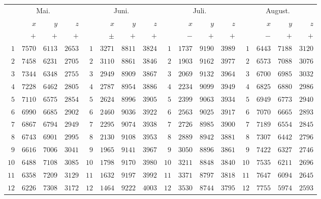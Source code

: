 \begin{GaussVISolarFrame}
\begingroup\fontsize{9}{10.2}\selectfont\setlength{\tabcolsep}{1.9pt}
\begin{tabular}{r|r|r|r||r|r|r|r||r|r|r|r||r|r|r|r}
\multicolumn{4}{c||}{Mai.} & \multicolumn{4}{c||}{Juni.} & \multicolumn{4}{c||}{Juli.} & \multicolumn{4}{c}{August.}\\[3pt]
 & $x$ & $y$ & $z$ &  & $x$ & $y$ & $z$ &  & $x$ & $y$ & $z$ &  & $x$ & $y$ & $z$\\
 & $+$ & $+$ & $+$ &  & $\pm$ & $+$ & $+$ &  & $-$ & $+$ & $+$ &  & $-$ & $+$ & $+$\\\hline
$1$ & $7570$ & $6113$ & $2653$ & $1$ & $3271$ & $8811$ & $3824$ & $1$ & $1737$ & $9190$ & $3989$ & $1$ & $6443$ & $7188$ & $3120$\\
$2$ & $7458$ & $6231$ & $2705$ & $2$ & $3110$ & $8861$ & $3846$ & $2$ & $1903$ & $9162$ & $3977$ & $2$ & $6573$ & $7088$ & $3076$\\
$3$ & $7344$ & $6348$ & $2755$ & $3$ & $2949$ & $8909$ & $3867$ & $3$ & $2069$ & $9132$ & $3964$ & $3$ & $6700$ & $6985$ & $3032$\\
$4$ & $7228$ & $6462$ & $2805$ & $4$ & $2787$ & $8954$ & $3886$ & $4$ & $2234$ & $9099$ & $3949$ & $4$ & $6825$ & $6880$ & $2986$\\
$5$ & $7110$ & $6575$ & $2854$ & $5$ & $2624$ & $8996$ & $3905$ & $5$ & $2399$ & $9063$ & $3934$ & $5$ & $6949$ & $6773$ & $2940$\\[3pt]
$6$ & $6990$ & $6685$ & $2902$ & $6$ & $2460$ & $9036$ & $3922$ & $6$ & $2563$ & $9025$ & $3917$ & $6$ & $7070$ & $6665$ & $2893$\\
$7$ & $6867$ & $6794$ & $2949$ & $7$ & $2295$ & $9074$ & $3938$ & $7$ & $2726$ & $8985$ & $3900$ & $7$ & $7189$ & $6554$ & $2845$\\
$8$ & $6743$ & $6901$ & $2995$ & $8$ & $2130$ & $9108$ & $3953$ & $8$ & $2889$ & $8942$ & $3881$ & $8$ & $7307$ & $6442$ & $2796$\\
$9$ & $6616$ & $7006$ & $3041$ & $9$ & $1965$ & $9141$ & $3967$ & $9$ & $3050$ & $8896$ & $3861$ & $9$ & $7422$ & $6327$ & $2746$\\
$10$ & $6488$ & $7108$ & $3085$ & $10$ & $1798$ & $9170$ & $3980$ & $10$ & $3211$ & $8848$ & $3840$ & $10$ & $7535$ & $6211$ & $2696$\\[3pt]
$11$ & $6358$ & $7209$ & $3129$ & $11$ & $1632$ & $9197$ & $3992$ & $11$ & $3371$ & $8797$ & $3818$ & $11$ & $7647$ & $6094$ & $2645$\\
$12$ & $6226$ & $7308$ & $3172$ & $12$ & $1464$ & $9222$ & $4003$ & $12$ & $3530$ & $8744$ & $3795$ & $12$ & $7755$ & $5974$ & $2593$\\

\end{tabular}
\end{GaussVISolarFrame}
